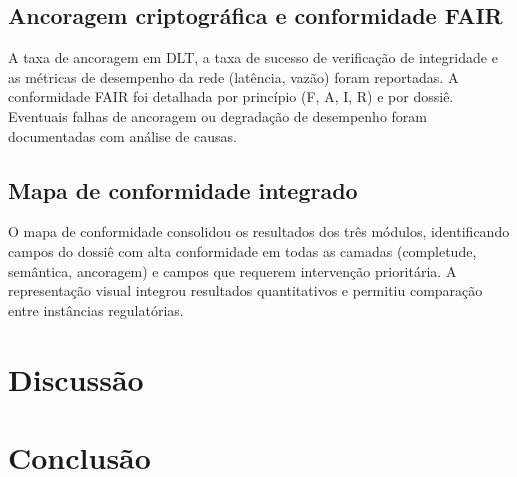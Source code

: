 \documentclass[preprint,12pt,authoryear]{elsarticle}
\begin{document}
\subsection{Ancoragem criptográfica e conformidade FAIR}
\label{subsec:res_dlt_cap5}

A taxa de ancoragem em DLT, a taxa de sucesso de verificação de integridade e as métricas de desempenho da rede (latência, vazão) foram reportadas. A conformidade FAIR foi detalhada por princípio (F, A, I, R) e por dossiê. Eventuais falhas de ancoragem ou degradação de desempenho foram documentadas com análise de causas.

\subsection{Mapa de conformidade integrado}
\label{subsec:res_map_cap5}

O mapa de conformidade consolidou os resultados dos três módulos, identificando campos do dossiê com alta conformidade em todas as camadas (completude, semântica, ancoragem) e campos que requerem intervenção prioritária. A representação visual integrou resultados quantitativos e permitiu comparação entre instâncias regulatórias.


\section{Discussão}


\section{Conclusão}





\end{document}
